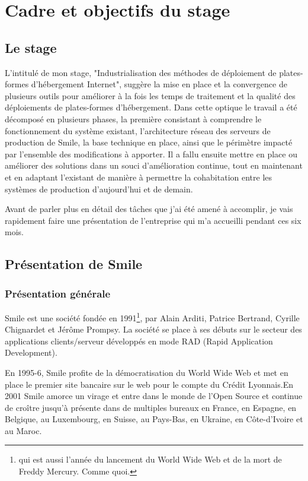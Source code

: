 \documentclass[14 pt,a4paper]{extreport}
\begin{document}
\section{Cadre et objectifs du stage}

\subsection{Le stage}L'intitulé de mon stage, "Industrialisation des méthodes de déploiement de plates-formes d'hébergement Internet", suggère la mise en place et la convergence de plusieurs outils pour améliorer à la fois les temps de traitement et la qualité des déploiements de plates-formes d'hébergement. Dans cette optique le travail a été décomposé en plusieurs phases, la première consistant à comprendre le fonctionnement du système existant, l'architecture réseau des serveurs de production de Smile, la base technique en place, ainsi que le périmètre impacté par l'ensemble des modifications à apporter. Il a fallu ensuite mettre en place ou améliorer des solutions dans un souci d'amélioration continue, tout en maintenant et en adaptant l'existant de manière à permettre la cohabitation entre les systèmes de production d'aujourd'hui et de demain.

Avant de parler plus en détail des tâches que j'ai été amené à accomplir, je vais rapidement faire une présentation de l'entreprise qui m'a accueilli pendant ces six mois.

\subsection{Présentation de Smile}

\subsubsection{Présentation générale}
Smile est une société fondée en 1991\footnote{qui est aussi l'année du lancement du World Wide Web et de la mort de Freddy Mercury. Comme quoi.}, par Alain Arditi, Patrice Bertrand, Cyrille Chignardet et Jérôme Prompsy. La société se place à ses débuts sur le secteur des applications clients/serveur développés en mode RAD (Rapid Application Development).

En 1995-6, Smile profite de la démocratisation du World Wide Web et met en place le premier site bancaire sur le web pour le compte du Crédit Lyonnais.En 2001 Smile amorce un virage et entre dans le monde de l'Open Source et continue de croître jusqu'à présente dans de multiples bureaux en France, en Espagne, en Belgique, au Luxembourg, en Suisse, au Pays-Bas, en Ukraine, en Côte-d'Ivoire et au Maroc.
\end{document}

